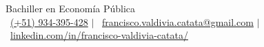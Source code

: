 \documentclass{resume} %
\begin{document}
\begin{center}
    \vspace{-15pt}
    {\large Bachiller en Economía Pública}
    \vspace{10pt} \\
    {\raisebox{-0.1\height}\faPhone\ {\href{tel:934395428}{(+51) 934-395-428}}} $|$ {\raisebox{-0.2\height}\faEnvelope\ {\href{mailto:francisco.valdivia.catata@gmail.com}{francisco.valdivia.catata@gmail.com}}} $|$ {\raisebox{-0.2\height}\faLinkedin\ {\href{https://www.linkedin.com/in/francisco-valdivia-catata/}{linkedin.com/in/francisco-valdivia-catata/}}}
    \vspace{10pt}
\end{center}




\end{document}
